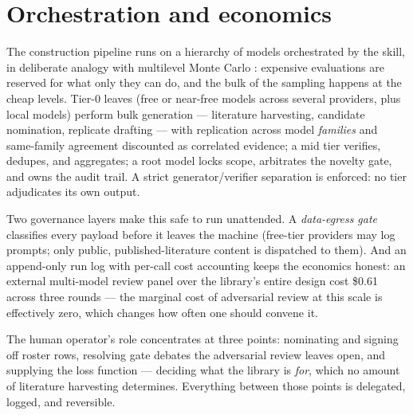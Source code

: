 \documentclass[11pt,a4paper]{article}
\begin{document}
\section{Orchestration and economics}\label{sec:orchestration}

The construction pipeline runs on a hierarchy of models orchestrated by the
 skill, in deliberate analogy with multilevel
Monte Carlo \citep{giles2008,giles2015}: expensive evaluations are reserved
for what only they can do, and the bulk of the sampling happens at the
cheap levels. Tier-0 leaves (free or near-free models across several
providers, plus local models) perform bulk generation --- literature
harvesting, candidate nomination, replicate drafting --- with replication
across model \emph{families} and same-family agreement discounted as
correlated evidence; a mid tier verifies, dedupes, and aggregates; a root
model locks scope, arbitrates the novelty gate, and owns the audit trail.
A strict generator/verifier separation is enforced: no tier adjudicates its
own output.

Two governance layers make this safe to run unattended. A
\emph{data-egress gate} classifies every payload before it leaves the
machine (free-tier providers may log prompts; only public,
published-literature content is dispatched to them). And an append-only run
log with per-call cost accounting keeps the economics honest: an external
multi-model review panel over the library's entire design cost \$0.61
across three rounds --- the marginal cost of adversarial review at this
scale is effectively zero, which changes how often one should convene it.

The human operator's role concentrates at three points: nominating and
signing off roster rows, resolving gate debates the adversarial review
leaves open, and supplying the loss function --- deciding what the library
is \emph{for}, which no amount of literature harvesting determines.
Everything between those points is delegated, logged, and reversible.
\end{document}
